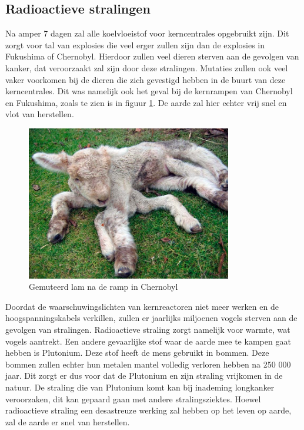 \subsection{Radioactieve stralingen}
Na amper 7 dagen zal alle koelvloeistof voor kerncentrales opgebruikt zijn. Dit zorgt voor tal van explosies die veel erger zullen zijn dan de explosies in Fukushima of Chernobyl. Hierdoor zullen veel dieren sterven aan de gevolgen van kanker, dat veroorzaakt zal zijn door deze stralingen. Mutaties zullen ook veel vaker voorkomen bij de dieren die zich gevestigd hebben in de buurt van deze kerncentrales. Dit was namelijk ook het geval bij de kernrampen van Chernobyl en Fukushima, zoals te zien is in figuur \ref{fig:mutatielam}. De aarde zal hier echter vrij snel en vlot van herstellen.\cite{LAPOutbreak} 
\begin{figure}[h]
	\centering
	\includegraphics[width=0.8\textwidth]{ChernobylLam.jpg}
	\caption{Gemuteerd lam na de ramp in Chernobyl \cite{ChernobylMutations}}
	\label{fig:mutatielam}
\end{figure}
\newline
Doordat de waarschuwingslichten van kernreactoren niet meer werken en de hoogspanningskabels verkillen, zullen er jaarlijks miljoenen vogels sterven aan de gevolgen van stralingen. Radioactieve straling zorgt namelijk voor warmte, wat vogels aantrekt.
\newline
Een andere gevaarlijke stof waar de aarde mee te kampen gaat hebben is Plutonium. Deze stof heeft de mens gebruikt in bommen. Deze bommen zullen echter hun metalen mantel volledig verloren hebben na 250 000 jaar. Dit zorgt er dus voor dat de Plutonium en zijn straling vrijkomen in de natuur. De straling die van Plutonium komt kan bij inademing longkanker veroorzaken, dit kan gepaard gaan met andere stralingsziektes.\cite{WorldWithoutUs}
\newline
Hoewel radioactieve straling een desastreuze werking zal hebben op het leven op aarde, zal de aarde er snel van herstellen. 
